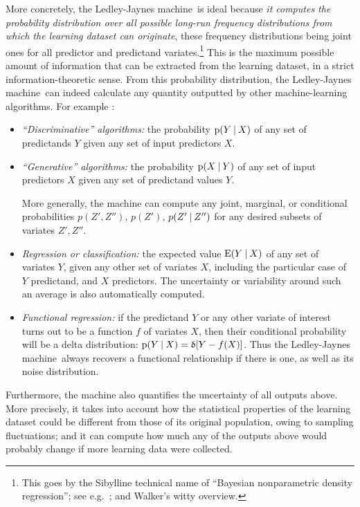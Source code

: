 \documentclass[utf8]{FrontiersinHarvard_mod} %
\newcommand*{\sect}{\S}%
\newcommand*{\eg}{{e.g.}}
\newcommand*{\p}{\mathrm{p}}%
\newcommand*{\E}{\mathrm{E}}
\renewcommand*{\|}[1][]{\nonscript\:#1\vert\nonscript\:\mathopen{}}
\newcommand*{\delt}{\updelta}
\newcommand*{\ljm}{Ledley-Jaynes machine}
\begin{document}
More concretely, the \ljm\ is ideal because \emph{it computes the probability distribution over all possible long-run frequency distributions from which the learning dataset can originate}, these frequency distributions being joint ones for all predictor and predictand variates.\footnote{This goes by the Sibylline technical name of \enquote{Bayesian nonparametric density regression}; see \eg\ \citet{rodriguezetal2009,bhattacharyaetal2010}; and Walker's \citeyearpar{walker2010} witty overview.} This is the maximum possible amount of information that can be extracted from the learning dataset, in a strict information-theoretic sense. From this probability distribution, the \ljm\ can indeed calculate any quantity outputted by other machine-learning algorithms. For example \citep[for terminology see \eg][\sect\,8.6]{murphy2012}:
\begin{itemize}
\item \emph{\enquote{Discriminative} algorithms:} the probability $\p(Y \| X)$ of any set of predictands $Y$ given any set of input predictors $X$.

\item \emph{\enquote{Generative} algorithms:}  the probability $\p(X \| Y)$ of any set of input predictors $X$ given any set of predictand values $Y$.

  More generally, the machine can compute any joint, marginal, or conditional probabilities $p(Z',Z'')$, $p(Z')$, $p(Z'\|Z'')$ for any desired subsets of variates $Z', Z''$.

\item \emph{Regression or classification:} the expected value $\E(Y\|X)$ of any set of variates $Y$, given any other set of variates $X$, including the particular case of $Y$ predictand, and $X$ predictors. The uncertainty or variability around such an average is also automatically computed.
  
\item \emph{Functional regression:} if the predictand $Y$ or any other variate of interest turns out to be a function $f$ of variates $X$, then their conditional probability will be a delta distribution: $\p(Y\|X) = \delt[Y-f(X)]$.
  Thus the \ljm\ always recovers a functional relationship if there is one, as well as its noise distribution.
\end{itemize}
Furthermore, the machine also quantifies the uncertainty of all outputs above. More precisely, it takes into account how the statistical properties of the learning dataset could be different from those of its original population, owing to sampling fluctuations; and it can compute how much any of the outputs above would probably change if more learning data were collected.
\end{document}
